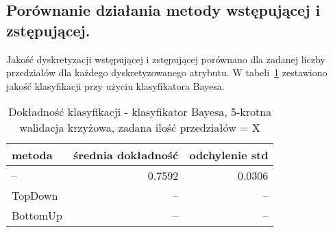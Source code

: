 \subsection{Porównanie działania metody wstępującej i zstępującej.}
Jakość dyskretyzacji wstępującej i zstępującej porównano dla zadanej liczby przedziałów dla każdego dyskretyzowanego atrybutu. W tabeli~\ref{tab:bayes_td_bu_comp_full_set} zestawiono jakość klasyfikacji przy użyciu klasyfikatora Bayesa.

\begin{table}[h!]
\begin{center}
\begin{tabular}{lrr}
\toprule
metoda & średnia dokładność & odchylenie std \\
\midrule
--      & 0.7592	& 0.0306 \\
TopDown & --		& --	\\
BottomUp& --		& --	\\
\bottomrule
\end{tabular}
\caption{Dokładność klasyfikacji - klasyfikator Bayesa, 5-krotna walidacja krzyżowa, zadana ilość przedziałów = X}
\label{tab:bayes_td_bu_comp_full_set}
\end{center}
\end{table}

